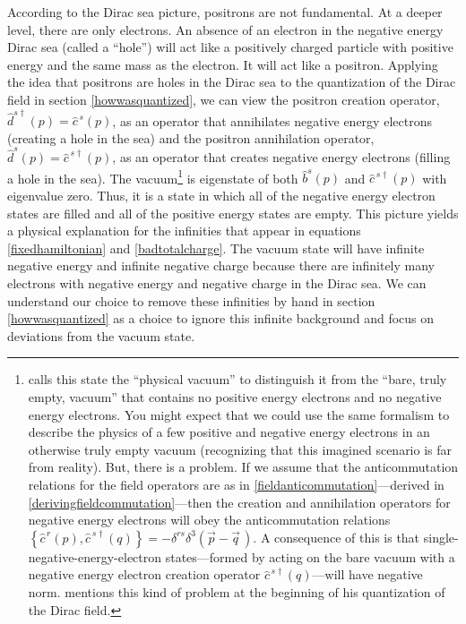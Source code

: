 \documentclass[12pt,secnumarabic,amsmath,amssymb,balancelastpage,nofootinbib]{article}
\begin{document}
According to the Dirac sea picture, positrons are not fundamental.  At a deeper level, there are only electrons.  An absence of an electron in the negative energy Dirac sea (called a ``hole'') will act like a positively charged particle with positive energy and the same mass as the electron.  It will act like a positron.  Applying the idea that positrons are holes in the Dirac sea to the quantization of the Dirac field in section \ref{howwasquantized}, we can view the positron creation operator, $\widehat{d}^{s\dagger}(p)=\widehat{c}^{\,s}(p)$, as an operator that annihilates negative energy electrons (creating a hole in the sea) and the positron annihilation operator, $\widehat{d}^{s}(p)=\widehat{c}^{\,s\dagger}(p)$, as an operator that creates negative energy electrons (filling a hole in the sea).  The vacuum\footnote{\citet[pg.\ 70]{hatfield} calls this state the ``physical vacuum'' to distinguish it from the ``bare, truly empty, vacuum'' that contains no positive energy electrons and no negative energy electrons.  You might expect that we could use the same formalism to describe the physics of a few positive and negative energy electrons in an otherwise truly empty vacuum (recognizing that this imagined scenario is far from reality).  But, there is a problem.  If we assume that the anticommutation relations for the field operators are as in \eqref{fieldanticommutation}---derived in \eqref{derivingfieldcommutation}---then the creation and annihilation operators for negative energy electrons will obey the anticommutation relations $\left\{\widehat{c}^{\,r}(p),\widehat{c}^{\,s \dagger}(q)\right\}= - \delta^{rs}\delta^3(\vec{p}-\vec{q}\,)$.  A consequence of this is that single-negative-energy-electron states---formed by acting on the bare vacuum with a negative energy electron creation operator $\widehat{c}^{\,s \dagger}(q)$---will have negative norm.  \citet[sec.\ 5.1]{tong} mentions this kind of problem at the beginning of his quantization of the Dirac field.} is eigenstate of both $\widehat{b}^{s}(p)$ and $\widehat{c}^{\,s\dagger}(p)$ with eigenvalue zero.  Thus, it is a state in which all of the negative energy electron states are filled and all of the positive energy states are empty.  This picture yields a physical explanation for the infinities that appear in equations \eqref{fixedhamiltonian} and \eqref{badtotalcharge}.  The vacuum state will have infinite negative energy and infinite negative charge because there are infinitely many electrons with negative energy and negative charge in the Dirac sea.  We can understand our choice to remove these infinities by hand in section \ref{howwasquantized} as a choice to ignore this infinite background and focus on deviations from the vacuum state.
\end{document}
